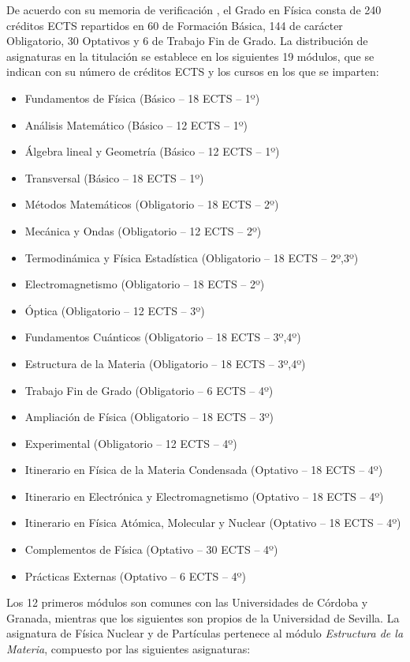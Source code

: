 \documentclass[a4paper,12pt,twoside]{article}
\begin{document}
De acuerdo con su memoria de verificación \cite{memver}, el Grado en Física consta de 240 créditos ECTS repartidos en 60 de Formación Básica, 144 de carácter Obligatorio, 30 Optativos y 6 de Trabajo Fin de Grado. La distribución de asignaturas en la titulación se establece en los siguientes 19 módulos, que se indican con su número de créditos ECTS y los cursos en los que se imparten:
\begin{itemize}
\item Fundamentos de Física (Básico -- 18 ECTS -- 1º)
\item Análisis Matemático (Básico -- 12 ECTS -- 1º)
\item Álgebra lineal y Geometría (Básico -- 12 ECTS -- 1º)
\item Transversal (Básico -- 18 ECTS -- 1º)
\item Métodos Matemáticos  (Obligatorio -- 18 ECTS -- 2º)
\item Mecánica y Ondas (Obligatorio -- 12 ECTS -- 2º)
\item Termodinámica y Física Estadística (Obligatorio -- 18 ECTS -- 2º,3º)
\item Electromagnetismo (Obligatorio -- 18 ECTS -- 2º)
\item Óptica (Obligatorio -- 12 ECTS -- 3º)
\item Fundamentos Cuánticos (Obligatorio -- 18 ECTS -- 3º,4º)
\item Estructura de la Materia (Obligatorio -- 18 ECTS -- 3º,4º)
\item Trabajo Fin de Grado (Obligatorio -- 6 ECTS -- 4º)
\item Ampliación de Física (Obligatorio -- 18 ECTS -- 3º)
\item Experimental (Obligatorio -- 12 ECTS -- 4º)
\item Itinerario en Física de la Materia Condensada (Optativo -- 18 ECTS -- 4º)
\item Itinerario en Electrónica y Electromagnetismo (Optativo -- 18 ECTS -- 4º)
\item Itinerario en Física Atómica, Molecular y Nuclear (Optativo -- 18 ECTS -- 4º)
\item Complementos de Física (Optativo -- 30 ECTS -- 4º)
\item Prácticas Externas (Optativo -- 6 ECTS -- 4º)
\end{itemize} 
 
Los 12 primeros módulos son comunes con las Universidades de Córdoba y Granada, mientras que los siguientes son propios de la Universidad de Sevilla. La asignatura de Física Nuclear y de Partículas pertenece al módulo \textit{Estructura de la Materia}, compuesto por las siguientes asignaturas:
\end{document}
